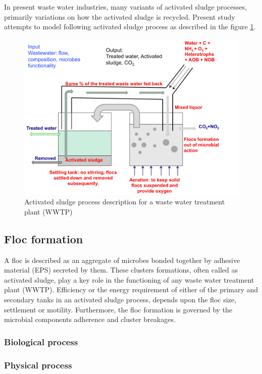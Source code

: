 \documentclass[11pt,a4paper,openright]{article}
\begin{document}
In present waste water industries, many variants of activated sludge processes, primarily variations on how the activated sludge is recycled. Present study attempts to model following activated sludge process as described in the figure \ref{fig:ASP}.

\begin{figure}[!htb]
\begin{center}
  \includegraphics[width=0.75\columnwidth]{Figs/ASP.png}
\caption{Activated sludge process description for a waste water treatment plant (WWTP)}
\label{fig:ASP}       %
\end{center}
\end{figure} 


\subsection{Floc formation}
A floc is described as an aggregate of microbes bonded together by adhesive material (EPS) secreted by them. These clusters formations, often called as activated sludge, play a key role in the functioning of any waste water treatment plant (WWTP). Efficiency or the energy requirement of either of the primary and secondary tanks in an activated sludge process, depends upon the floc size, settlement or motility. Furthermore, the floc formation is governed by the microbial components adherence and cluster breakages.

\subsubsection{Biological process}
\subsubsection{Physical process}
\end{document}
